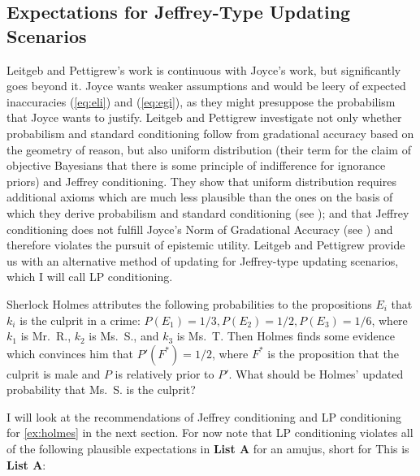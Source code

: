 \documentclass[11pt]{article}
\begin{document}
\subsection{Expectations for Jeffrey-Type Updating Scenarios}
\label{subsec:vidiedoo}

Leitgeb and Pettigrew's work is continuous with Joyce's work, but
significantly goes beyond it. Joyce wants weaker assumptions and would
be leery of expected inaccuracies (\ref{eq:eli}) and (\ref{eq:egi}),
as they might presuppose the probabilism that Joyce wants to justify.
Leitgeb and Pettigrew investigate not only whether probabilism and
standard conditioning follow from gradational accuracy based on the
geometry of reason, but also uniform distribution (their term for the
claim of objective Bayesians that there is some principle of
indifference for ignorance priors) and Jeffrey conditioning. They show
that uniform distribution requires additional axioms which are much
less plausible than the ones on the basis of which they derive
probabilism and standard conditioning (see
); and that Jeffrey conditioning
does not fulfill Joyce's Norm of Gradational Accuracy (see
) and therefore violates the pursuit of
epistemic utility. Leitgeb and Pettigrew provide us with an alternative
method of updating for Jeffrey-type updating scenarios, which I will
call LP conditioning.

\begin{quotex}
  \label{ex:holmes} Sherlock Holmes
  attributes the following probabilities to the propositions $E_{i}$
  that $k_{i}$ is the culprit in a crime:
  $P(E_{1})=1/3,P(E_{2})=1/2,P(E_{3})=1/6$, where $k_{1}$ is Mr.\ R.,
  $k_{2}$ is Ms.\ S., and $k_{3}$ is Ms.\ T. Then Holmes finds some
  evidence which convinces him that $P'(F^{*})=1/2$, where $F^{*}$ is
  the proposition that the culprit is male and $P$ is relatively prior
  to $P'$. What should be Holmes' updated probability that Ms.\ S. is
  the culprit?
\end{quotex}

I will look at the recommendations of Jeffrey conditioning and LP
conditioning for {\xample} \ref{ex:holmes} in the next section. For
now note that LP conditioning violates all of the following plausible
expectations in \textbf{List A}\label{page:listone} for an amujus, 
short for  This is \textbf{List A}:
\end{document}
